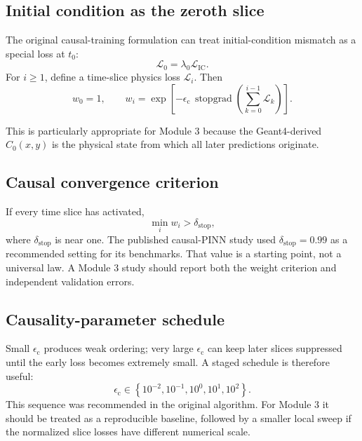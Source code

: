\documentclass[11pt]{article}
\newcommand{\Lic}{\mathcal{L}_{\mathrm{IC}}}
\newcommand{\stgrad}{\operatorname{stopgrad}}
\newcommand{\epsc}{\epsilon_{\mathrm{c}}}
\newcommand{\deltaStop}{\delta_{\mathrm{stop}}}
\begin{document}
\subsection{Initial condition as the zeroth slice}

The original causal-training formulation can treat initial-condition mismatch as a special loss at $t_0$:
\begin{equation}
\mathcal{L}_0
=
\lambda_0\Lic.
\end{equation}
For $i\ge1$, define a time-slice physics loss $\mathcal{L}_i$. Then
\begin{equation}
w_0=1,
\qquad
w_i
=
\exp\left[
-\epsc\,
\stgrad\left(
\sum_{k=0}^{i-1}\mathcal{L}_k
\right)
\right].
\label{eq:ic_in_prefix}
\end{equation}

This is particularly appropriate for Module 3 because the Geant4-derived $C_0(x,y)$ is the physical state from which all later predictions originate.

\subsection{Causal convergence criterion}

If every time slice has activated,
\begin{equation}
\min_i w_i>\deltaStop,
\label{eq:weight_stop}
\end{equation}
where $\deltaStop$ is near one. The published causal-PINN study used $\deltaStop=0.99$ as a recommended setting for its benchmarks. That value is a starting point, not a universal law. A Module 3 study should report both the weight criterion and independent validation errors.

\subsection{Causality-parameter schedule}

Small $\epsc$ produces weak ordering; very large $\epsc$ can keep later slices suppressed until the early loss becomes extremely small. A staged schedule is therefore useful:
\begin{equation}
\epsc
\in
\left\{
10^{-2},10^{-1},10^0,10^1,10^2
\right\}.
\label{eq:epsilon_schedule}
\end{equation}
This sequence was recommended in the original algorithm. For Module 3 it should be treated as a reproducible baseline, followed by a smaller local sweep if the normalized slice losses have different numerical scale.
\end{document}
